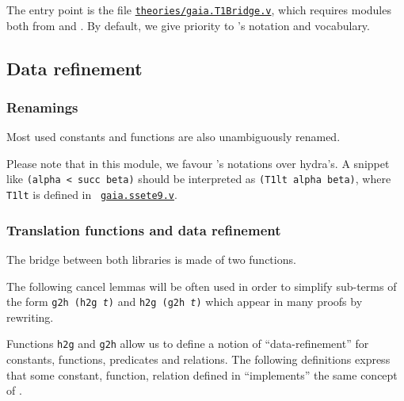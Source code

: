 The \gaiaHydras entry point is the file
\href{../theories/html/gaia_hydras.T1Bridge.html}%
{\texttt{theories/gaia.T1Bridge.v}}, which requires modules both from \HydrasLib and \gaia. By default, we give priority to \gaia's notation and vocabulary.






\subsection{Data refinement}

\subsubsection{Renamings}

Most used constants and functions are also unambiguously renamed.



Please note that in this module, we favour \gaia's notations over hydra's. A snippet like \texttt{(alpha < succ beta)} should be interpreted as \texttt{(T1lt alpha beta)}, where \texttt{T1lt} is defined in ~\href{https://github.com/coq-community/gaia/blob/master/theories/ssete9.v}{\texttt{gaia.ssete9.v}}.


\subsubsection{Translation functions and data refinement}

The bridge between both libraries is made of two functions.


The following cancel lemmas will be often used in order to simplify sub-terms of the form \texttt{g2h (h2g {\it t})} and \texttt{h2g (g2h {\it t})} which appear in many proofs by rewriting.





Functions \texttt{h2g} and \texttt{g2h} allow us to define
a notion of ``data-refinement''  for constants, functions, predicates and relations. The following definitions express that some
constant, function, relation defined in \HydrasLib ``implements'' the same concept of \gaia.

